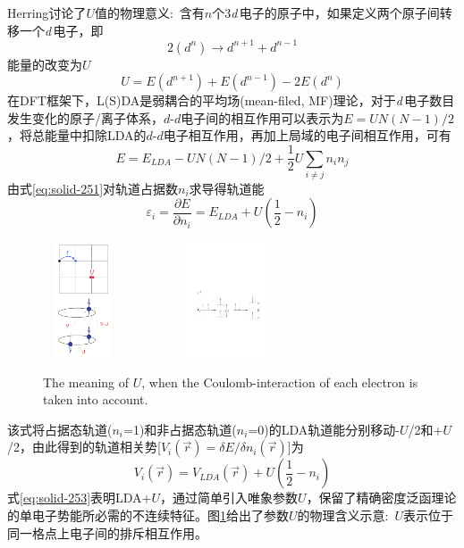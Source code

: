 {%
\textrm{Herring}讨论了$U$值的物理意义:~含有$n$个3{\textit d}\,电子的原子中，如果定义两个原子间转移一个{\textit d}\,电子，即
$$2(d^n)\rightarrow d^{n+1}+d^{n-1}$$
能量的改变为$U$
$$U=E(d^{n+1})+E(d^{n-1})-2E(d^n)$$
在\textrm{DFT}框架下，\textrm{L(S)DA}是弱耦合的平均场(\textrm{mean-filed, MF})理论，对于{\textit d}\,电子数目发生变化的原子/离子体系，$d$-$d$电子间的相互作用可以表示为$E=UN(N-1)/2$%
，将总能量中扣除LDA的$d$-$d$电子相互作用，再加上局域的电子间相互作用，可有
\begin{equation}
  E=E_{LDA}-UN(N-1)/2+\frac12U\sum_{i\neq j}n_in_j
  \label{eq:solid-251}
\end{equation}
由式\eqref{eq:solid-251}对轨道占据数$n_i$求导得轨道能
\begin{equation}
  \varepsilon_i=\frac{\partial E}{\partial n_i}=E_{LDA}+U(\frac12-n_i)
  \label{eq:solid-252}
\end{equation}
\begin{figure}[h!]
\centering
\includegraphics[height=1.35in,width=0.92in,viewport=1 1 240 375,clip]{Figures/LDA_U-1.png}
\includegraphics[height=1.35in,width=2.32in,viewport=110 210 545 455,clip]{Figures/LDA_U.pdf}
\caption{\small \textrm{The meaning of $U$, when the Coulomb-interaction of each electron is taken into account.}}%
\label{U_means}
\end{figure}
该式将占据态轨道($n_i$=1)和非占据态轨道($n_i$=0)的LDA轨道能分别移动-$U$/2和+$U$/2，由此得到的轨道相关势[$V_i(\vec r)=\delta E/\delta n_i(\vec r)$]为
\begin{equation}
  V_i(\vec r)=V_{LDA}(\vec r)+U(\frac12-n_i)
  \label{eq:solid-253}
\end{equation}
式\eqref{eq:solid-253}表明\textrm{LDA}+$U$，通过简单引入唯象参数$U$，保留了精确密度泛函理论的单电子势能所必需的不连续特征。图\ref{U_means}给出了参数$U$的物理含义示意:~$U$表示位于同一格点上电子间的排斥相互作用。

}
